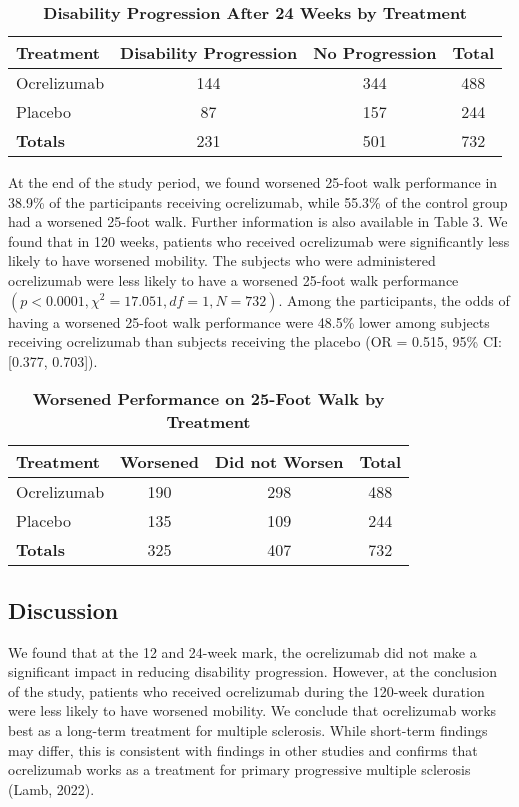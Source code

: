 \documentclass{article}
\begin{document}
	\begin{table}[h]
		\centering
		\footnotesize
		\caption{\textbf{Disability Progression After 24 Weeks by Treatment}}
		\renewcommand{\arraystretch}{1.2}
		\begin{tabular}{lcc|c}
			\toprule
			\textbf{Treatment} & \textbf{Disability Progression} & \textbf{No Progression} & \textbf{Total} \\
			\midrule
			Ocrelizumab & 144 & 344 & 488 \\
			Placebo & 87 & 157 & 244 \\
			\midrule
			\textbf{Totals} & 231 & 501 & 732 \\
			\bottomrule
		\end{tabular}
	\end{table}

	At the end of the study period, we found worsened 25-foot walk performance in 38.9\% of the participants receiving ocrelizumab, while 55.3\% of the control group had a worsened 25-foot walk. Further information is also available in Table 3. We found that in 120 weeks, patients who received ocrelizumab were significantly less likely to have worsened mobility. The subjects who were administered ocrelizumab were less likely to have a worsened 25-foot walk performance $(p < 0.0001, \chi^2 = 17.051, df = 1, N = 732)$. Among the participants, the odds of having a worsened 25-foot walk performance were 48.5\% lower among subjects receiving ocrelizumab than subjects receiving the placebo (OR = 0.515, 95\% CI: [0.377, 0.703]).

	\begin{table}[h]
		\centering
		\footnotesize
		\caption{\textbf{Worsened Performance on 25-Foot Walk by Treatment}}
		\renewcommand{\arraystretch}{1.2}
		\begin{tabular}{lcc|c}
			\toprule
			\textbf{Treatment} & \textbf{Worsened} & \textbf{Did not Worsen} & \textbf{Total} \\
			\midrule
			Ocrelizumab & 190 & 298 & 488 \\
			Placebo & 135 & 109 & 244 \\
			\midrule
			\textbf{Totals} & 325 & 407 & 732 \\
			\bottomrule
		\end{tabular}
	\end{table}

	\subsection*{Discussion}
	We found that at the 12 and 24-week mark, the ocrelizumab did not make a significant impact in reducing disability progression. However, at the conclusion of the study, patients who received ocrelizumab during the 120-week duration were less likely to have worsened mobility. We conclude that ocrelizumab works best as a long-term treatment for multiple sclerosis. While short-term findings may differ, this is consistent with findings in other studies and confirms that ocrelizumab works as a treatment for primary progressive multiple sclerosis (Lamb, 2022).
\end{document}
